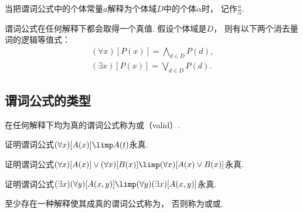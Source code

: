 当把谓词公式中的个体常量\(a\)解释为个体域\(D\)中的个体\(\alpha\)时，
记作\(\frac{a}{\alpha}\).

谓词公式在任何解释下都会取得一个真值.
假设个体域是\(D\)，
则有以下两个消去量词的逻辑等值式：\begin{gather}
	(\forall x)[P(x)]
	= \bigwedge_{d \in D} P(d), \\
	(\exists x)[P(x)]
	= \bigvee_{d \in D} P(d).
\end{gather}

\subsection{谓词公式的类型}
在任何解释下均为真的谓词公式称为或（valid）.

\begin{example}
证明谓词公式\((\forall x)[A(x)] \limp A(t)\)永真.
\end{example}

\begin{example}
证明谓词公式\(
	(\forall x)[A(x)]
	\lor
	(\forall x)[B(x)]
	\limp
	(\forall x)
	[
		A(x) \lor B(x)
	]
\)永真.
\end{example}

\begin{example}
证明谓词公式\(
	(\exists x)
	(\forall y)
	[A(x,y)]
	\limp
	(\forall y)
	(\exists x)
	[A(x,y)]
\)永真.
\end{example}

至少存在一种解释使其成真的谓词公式称为，
否则称为或或.

